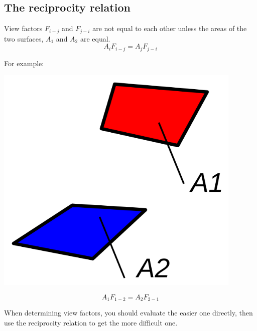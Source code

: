 \documentclass[11pt]{article}
\begin{document}
\subsection{The reciprocity relation}
\label{sec:org6d33dbd}
View factors \(F_{i-j}\) and \(F_{j-i}\) are not equal to each other unless the areas of the two surfaces, \(A_1\) and \(A_2\) are equal.
\[A_i F_{i-j} = A_j F_{j-i}\]

For example:
\begin{center}
\includegraphics[width=.9\linewidth]{./images/view-factor-surfaces-a1-and-a2-diagram.png}
\end{center}
\[A_1 F_{1-2} = A_2 F_{2-1}\]

When determining view factors, you should evaluate the easier one directly, then use the reciprocity relation to get the more difficult one.

 \newpage
\end{document}
